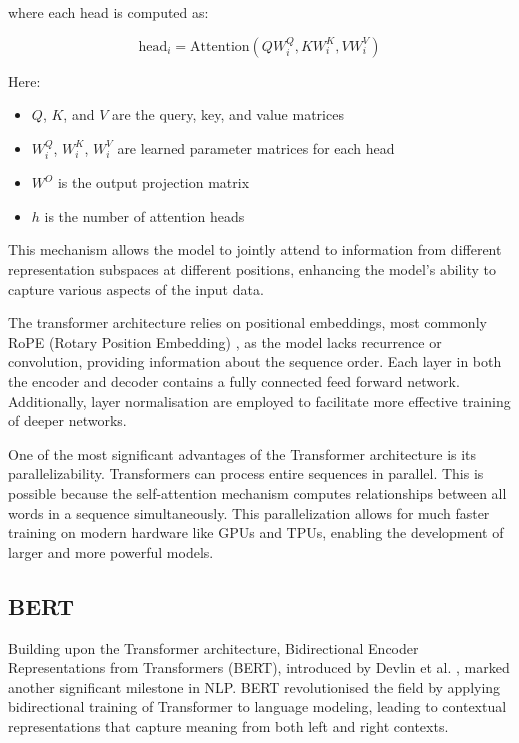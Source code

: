 \documentclass[a4paper, oneside]{discothesis}
\begin{document}
where each head is computed as:

\begin{equation}
\text{head}_i = \text{Attention}(QW_i^Q, KW_i^K, VW_i^V)
\end{equation}

Here:
\begin{itemize}
    \item $Q$, $K$, and $V$ are the query, key, and value matrices
    \item $W_i^Q$, $W_i^K$, $W_i^V$ are learned parameter matrices for each head
    \item $W^O$ is the output projection matrix
    \item $h$ is the number of attention heads
\end{itemize}

This mechanism allows the model to jointly attend to information from different representation subspaces at different positions, enhancing the model's ability to capture various aspects of the input data.

The transformer architecture relies on positional embeddings, most commonly RoPE (Rotary Position Embedding) \cite{su2023roformer}, as the model lacks recurrence or convolution, providing information about the sequence order. Each layer in both the encoder and decoder contains a fully connected feed forward network. Additionally, layer normalisation are employed to facilitate more effective training of deeper networks.

One of the most significant advantages of the Transformer architecture is its parallelizability. Transformers can process entire sequences in parallel. This is possible because the self-attention mechanism computes relationships between all words in a sequence simultaneously. This parallelization allows for much faster training on modern hardware like GPUs and TPUs, enabling the development of larger and more powerful models.

\subsection{BERT}
Building upon the Transformer architecture, Bidirectional Encoder Representations from Transformers (BERT), introduced by Devlin et al. \cite{devlin2018bert}, marked another significant milestone in NLP. BERT revolutionised the field by applying bidirectional training of Transformer to language modeling, leading to contextual representations that capture meaning from both left and right contexts.
\end{document}
